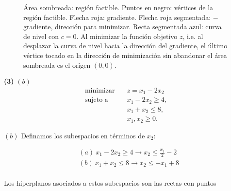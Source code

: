 \documentclass[12pt]{article}
\begin{document}
\begin{figure}[htbp]
    \caption{Área sombreada: región factible. Puntos en negro: vértices de la
        región factible. Flecha roja: gradiente. Flecha
        roja segmentada: $-$gradiente, dirección para minimizar. Recta
        segmentada azul: curva de nivel con $c = 0$.
    Al minimizar la función objetivo $z$, i.e. al desplazar la
    curva de nivel hacia la dirección del gradiente, el último vértice tocado en
la dirección de minimización sin abandonar el área sombreada es el origen
$(0,0)$.}
\end{figure}

\pagebreak 

\begin{myframe}

    \textbf{(3)} $(b)$
\[
\begin{aligned}
\text{minimizar} \quad & z = x_1 - 2x_2 \\
\text{sujeto a} \quad
& x_1 - 2x_2 \geq 4, \\
& x_1 + x_2 \leq 8, \\
& x_1, x_2 \geq 0.
\end{aligned}
\]
\end{myframe}

$(b)$ Definamos los subespacios en términos de $x_2$:

\begin{align*}
    &(a) ~ x_1 - 2x_2 \geq 4 \to x_2 \leq \frac{x_1}{2} - 2 \\ 
    &(b) ~ x_1 + x_2 \leq 8 \to  x_2 \leq -x_1 + 8 \\ 
\end{align*}

Los hiperplanos asociados a estos subespacios son las rectas con puntos
\end{document}
